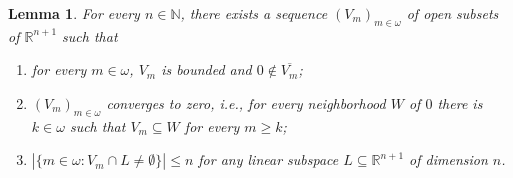 \documentclass[preprint,11pt]{elsarticle}
\newtheorem{lemma}[theorem]{Lemma}
\theoremstyle{definition}
\theoremstyle{remark}
\numberwithin{equation}{section}
\numberwithin{theorem}{section}
\newcommand{\w}{\omega}
\newcommand{\NN}{\mathbb{N}}
\newcommand{\IR}{\mathbb{R}}
\begin{document}
\begin{lemma}\label{l:Rn+1-ls}
For every $n\in\NN$, there exists a sequence $(V_m)_{m\in \w}$ of open subsets of $\IR^{n+1}$ such that
\begin{enumerate}
\item[{\rm(i)}] for every $m\in\w$, $V_m$ is bounded and $0\not\in \overline{V_m}$;
\item[{\rm(ii)}] $(V_m)_{m\in \w}$ converges to zero, i.e., for every neighborhood $W$ of $0$ there is $k\in\w$ such that $V_m\subseteq W$ for every $m\geq k$;
\item[{\rm(iii)}] $|\{m\in\w: V_m\cap L\neq\emptyset\}|\leq n $ for any linear subspace $L\subseteq \IR^{n+1}$ of dimension $n$.
\end{enumerate}
\end{lemma}
\end{document}
